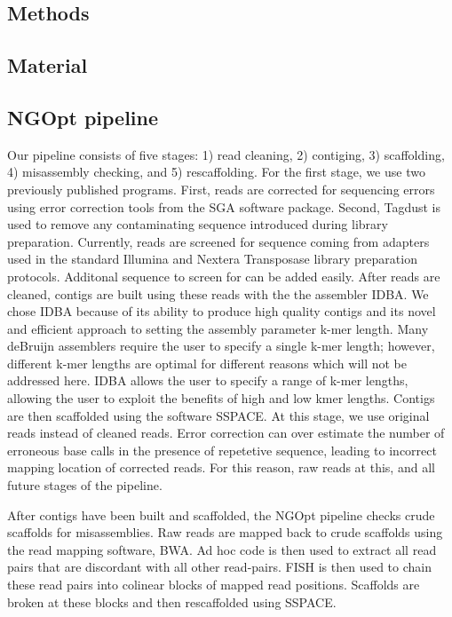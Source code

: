 \documentclass{bioinfo}
\begin{document}
\begin{methods}
\section{Methods}
\subsection{Material}
\subsection{NGOpt pipeline}

Our pipeline consists of five stages: 1) read cleaning, 2) contiging, 3) scaffolding,
4) misassembly checking, and 5) rescaffolding. For the first stage, we use two previously
published programs. First, reads are corrected for sequencing errors using error correction tools from the
SGA software package. Second, Tagdust is used to remove any contaminating sequence introduced
during library preparation. Currently, reads are screened for sequence coming from adapters
used in the standard Illumina and Nextera Transposase library preparation protocols. Additonal 
sequence to screen for can be added easily. After reads are cleaned, contigs are built
using these reads with the the assembler IDBA. We chose IDBA because of its ability to produce 
high quality contigs and its novel and efficient approach to setting the assembly parameter k-mer length. 
Many deBruijn assemblers require the user to specify a single k-mer length; however, different k-mer
lengths are optimal for different reasons which will not be addressed here. IDBA allows the user to specify
a range of k-mer lengths, allowing the user to exploit the benefits of high and low kmer lengths.
Contigs are then scaffolded
using the software SSPACE. At this stage, we use original reads instead of cleaned reads. Error correction
can over estimate the number of erroneous base calls in the presence of repetetive sequence, leading to
incorrect mapping location of corrected reads. For this reason, raw reads at this, and all future
stages of the pipeline. 

After contigs have been built and scaffolded, the NGOpt pipeline checks crude scaffolds for 
misassemblies. Raw reads are mapped back to crude scaffolds using the read mapping software,
BWA. Ad hoc code is then used to extract all read pairs that are discordant with all other
read-pairs. FISH is then used to chain these read pairs into colinear blocks of mapped read positions. 
Scaffolds are broken at these blocks and then rescaffolded using SSPACE.


\end{methods}
\end{document}
